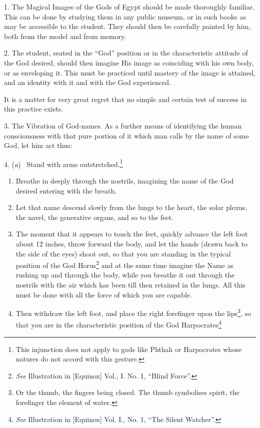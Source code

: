 
1. The Magical Images of the Gods of Egypt should be made thoroughly familiar. This can be done by studying them in any public museum, or in such books as may be accessible to the student. They should then be carefully painted by him, both from the model and from memory.

2. The student, seated in the \enquote{God} position or in the characteristic attitude of the God desired, should then imagine His image as coinciding with his own body, or as enveloping it. This must be practiced until mastery of the image is attained, and an identity with it and with the God experienced.

It is a matter for very great regret that no simple and certain test of success in this practice exists.

3. The Vibration of God-names. As a further means of identifying the human consciousness with that pure portion of it which man calls by the name of some God, let him act thus:

4. (\textit{a}) \-\ Stand with arms outstretched.\footnote{This injunction does not apply to gods like Phthah or Harpocrates whose natures do not accord with this gesture.} \begin{enumerate}[start=2, label=(\textit{\alph*}), leftmargin=3.57\parindent]
\item Breathe in deeply through the nostrils, imagining the name of the God desired entering with the breath.
\item Let that name descend slowly from the lungs to the heart, the solar plexus, the navel, the generative organs, and so to the feet.
\item The moment that it appears to touch the feet, quickly advance the left foot about 12 inches, throw forward the body, and let the hands (drawn back to the side of the eyes) shoot out, so that you are standing in the typical position of the God Horus\footnote{\textit{See} Illustration in [Equinox] Vol., I. No. 1, \enquote{Blind Force}.} and at the same time imagine the Name as rushing up and through the body, while you breathe it out through the nostrils with the air which has been till then retained in the lungs. All this must be done with all the force of which you are capable.
\item Then withdraw the left foot, and place the right forefinger upon the lips\footnote{Or the thumb, the fingers being closed. The thumb symbolises spirit, the forefinger the element of water.}, so that you are in the characteristic position of the God Harpocrates\footnote{\textit{See} Illustration in [Equinox] Vol. I., No. 1, \enquote{The Silent Watcher}.}
\end{enumerate}

